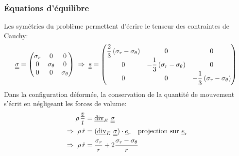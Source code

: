 \documentclass[10pt]{book}
\begin{document}
\subsubsection{Équations d'équilibre}
Les symétries du problème permettent d'écrire le tenseur des contraintes de Cauchy: 
$$\underline{\underline{\sigma}}= 
\begin{pmatrix}
\sigma_r  & 0 & 0 \\
0 & \sigma_\theta  & 0 \\
0 & 0 & \sigma_\theta 
\end{pmatrix} \; \Rightarrow \; \underline{\underline{s}}= \begin{pmatrix}
\dfrac{2}{3}\left(\sigma_r-\sigma_\theta\right)  & 0 & 0 \\
0 & -\dfrac{1}{3}\left(\sigma_r-\sigma_\theta\right)  & 0 \\
0 & 0 & -\dfrac{1}{3}\left(\sigma_r-\sigma_\theta\right)
\end{pmatrix}$$
Dans la configuration déformée, la conservation de la quantité de mouvement s'écrit en négligeant les forces de volume:
\begin{align}\nonumber
\rho\,\dfrac{\underline{v}}{t} &= \vdiv_E\,\ten{\sigma}\\\nonumber
\implique \rho\,\ddot{r} &= (\vdiv_E\,\ten{\sigma})\cdot \er \quad \text{projection sur $\er$}\\\label{eq:equilibre_dyna}
\implique \rho\,\ddot{r} &=\dfrac{\sigma_r}{r}+ 2\dfrac{\sigma_r-\sigma_{\theta}}{r}
\end{align}
\end{document}
